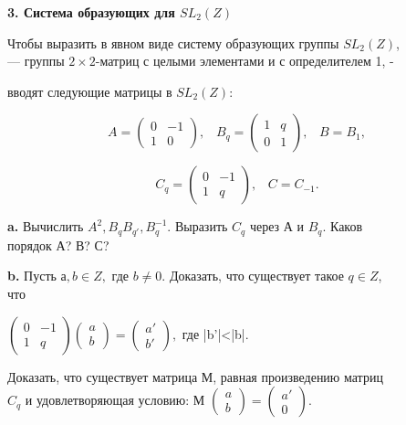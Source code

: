 \medskip

{\noindent \bf 3. Система образующих для $SL_2(Z)$} 

\medskip

Чтобы выразить в явном виде систему образующих группы $SL_2(Z)$,\\
— группы $2 \times 2$-матриц с целыми элементами и с определителем 1, -

\pagebreak


вводят следующие матрицы в $SL_2(\mathit{Z})$: 

$$A = \begin{pmatrix}
0 & -1\\ 1 & 0
\end{pmatrix},\;\;\;
B_q = \begin{pmatrix}
1 & q\\ 0 & 1
\end{pmatrix}, \;\;\; B=B_1,
$$

$$C_q = \begin{pmatrix}
0 & -1\\ 1 & q
\end{pmatrix},\;\;\;C = C_{-1}.$$

\medskip

{\bf a.} Вычислить $A^2, B_qB_{q'}, B_q^{-1}.$ Выразить $C_q$ через А и $B_q$. Каков\\ 
порядок $А$? $В$? $С$?

\medskip

{\bf b.} Пусть $а,b \in \mathit{Z},$ где $b\ne 0$. Доказать, что существует такое $q \in \mathit{Z}$,\\ 
что 

{\begin{center}
$\begin{pmatrix}
0 & -1\\ 1 & q
\end{pmatrix}\begin{pmatrix}
a\\ b
\end{pmatrix}
=\begin{pmatrix}
a'\\ b'
\end{pmatrix},$\;\;\; где |b'|<|b|.
\end{center}}

 
Доказать, что существует матрица М, равная произведению матриц \\
$C_q$ и удовлетворяющая условию: М $
\begin{pmatrix}
a\\ b
\end{pmatrix}
=\begin{pmatrix}
a'\\ 0 
\end{pmatrix}.
$ 

